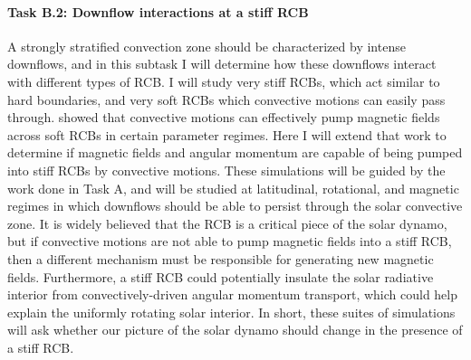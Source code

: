 \documentclass[aasms,11pt, longbibliography]{article}
\begin{document}
\paragraph{Task B.2: Downflow interactions at a stiff RCB}
\label{sct:taskB2}
A strongly stratified convection zone should be characterized by intense downflows, and in this subtask I will determine how these downflows interact with different types of RCB.
I will study very stiff RCBs, which act similar to hard boundaries, and very soft RCBs which convective motions can easily pass through.
\citet{tobias&all1998} showed that convective motions can effectively pump magnetic fields across soft RCBs in certain parameter regimes.
Here I will extend that work  to determine if magnetic fields and angular momentum are capable of being pumped into stiff RCBs by convective motions.
These simulations will be guided by the work done in Task A, and will be studied at latitudinal, rotational, and magnetic regimes in which downflows should be able to persist through the solar convective zone.
It is widely believed that the RCB is a critical piece of the solar dynamo, but if convective motions are not able to pump magnetic fields into a stiff RCB, then a different mechanism must be responsible for generating new magnetic fields.
Furthermore, a stiff RCB could potentially insulate the solar radiative interior from convectively-driven angular momentum transport, which could help explain the uniformly rotating solar interior.
In short, these suites of simulations will ask whether our picture of the solar dynamo should change in the presence of a stiff RCB.
\end{document}
